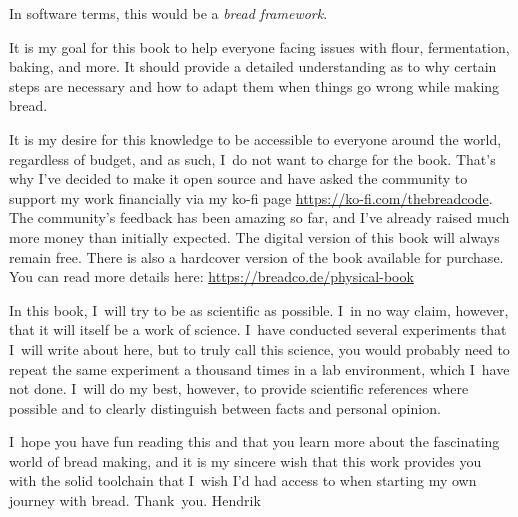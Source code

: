 In software terms, this would be a \emph{bread framework}.

It is my goal for this book to help everyone facing issues with flour, fermentation, baking,
and more. It should provide a detailed understanding as to why certain steps are necessary
and how to adapt them when things go wrong while making bread.

It is my desire for this knowledge to be accessible to everyone around the world, regardless
of budget, and as such, I~do not want to charge for the book. That's why I've decided to make
it open source and have asked the community to support my work financially via my ko-fi page
\url{https://ko-fi.com/thebreadcode}. The community's feedback has been amazing so far, and
I've already raised much more money than initially expected. The digital version of this book
will always remain free. There is also a hardcover version of the book available for purchase.
You can read more details here: \url{https://breadco.de/physical-book}

In this book, I~will try to be as scientific as possible. I~in no way claim, however, that
it will itself be a work of science. I~have conducted several experiments that I~will write
about here, but to truly call this science, you would probably need to repeat the same experiment
a thousand times in a lab environment, which I~have not done. I~will do my best, however, to provide
scientific references where possible and to clearly distinguish between facts and personal opinion.

I~hope you have fun reading this and that you learn more about the fascinating world of bread
making, and it is my sincere wish that this work provides you with the solid toolchain that I~wish
I'd had access to when starting my own journey with bread.
\vspace{\baselineskip}\linebreak
\noindent \mbox{Thank you.}
\vspace{\baselineskip}\linebreak
\noindent Hendrik
